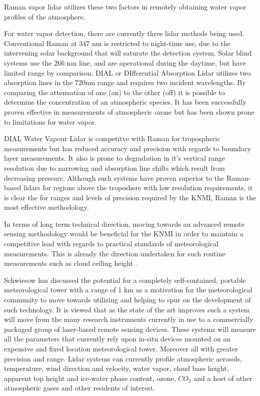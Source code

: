 Raman vapor lidar utilizes these two factors in remotely obtaining 
water vapor profiles of the atmosphere. 

For water vapor detection, there are currently three lidar methods 
being used. Conventional Raman at 347 nm is restricted to night-time 
use, due to the intervening solar background that will saturate the 
detection system. Solar blind systems use the 266 nm line, and are 
operational during the daytime, but have limited range by comparison.
DIAL or DIfferential Absorption Lidar utilizes two absorption lines 
in the 720nm range and requires two incident wavelengths. By 
comparing the attenuation of one (on) to the other (off) it is possible 
to determine the concentration  of an atmospheric species. It has been 
successfully proven effective in measurements of atmospheric ozone but 
has been shown prone to limitations for water vapor. 

DIAL Water Vapour Lidar is competitve with Raman for tropospheric 
measurements but has reduced accuracy and precision with regards to 
boundary layer measurements. It also is prone to degradation in it's 
vertical range resolution due to narrowing and absorption line shifts
which result from decreasing pressure\cite{cwmrevwlwm}. 
Although such systems have 
proven superior to the Raman-based lidars for regions above the 
troposhere with low resolution requirements, it is clear the for ranges 
and levels of precision required by the KNMI, Raman is the most 
effective methodology.

In terms of long term technical direction, moving towards an 
advanced remote sensing methodology would be beneficial for the KNMI in 
order to maintain a competitive lead with regards to practical 
standards of meteorological measurements. This is already the direction 
undertaken for such routine measurements such as cloud ceiling height
\cite{psajfacapvlgjp}.

Schwiesow \cite{rls} has discussed the potential for a completely 
self-contained, portable meteorological tower 
with a range of 1 km as a 
motivation for the meteorological community to move towards utilizing and
helping to spur on the development of such technology. It is viewed 
that as the state of the art improves such a system will move from the
many research instruments currently in use to a commercially packaged 
group of laser-based remote sensing devices. These systems will 
measure all the parameters that currently rely upon in-situ devices 
mounted on an expensive and fixed location meteorological tower. 
Moreover all with greater precision and range. Lidar systems can 
currently profile atmospheric aerosols, temperature, wind direction and 
velocity, water vapor, cloud base height, apparent top height and 
ice-water phase content, ozone, $CO_{2}$ and a host of other atmospheric gases
and other residents of interest. 

